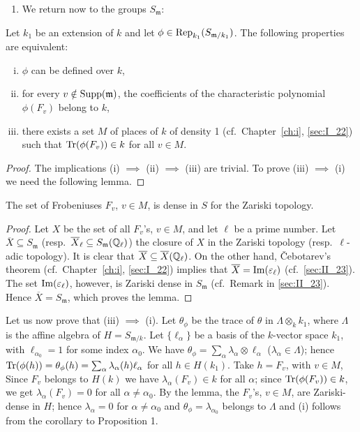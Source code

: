 \begin{enumerate}[resume*]
	\item We return now to the groups $S_{\mathfrak{m}}$:
\end{enumerate}
\begin{prop}
Let $k_1$ be an extension of $k$ and let $\phi \in
\operatorname{Rep}_{k_1}(S_{\mathfrak{m} /k_1})$. The following properties are equivalent:
\begin{enumerate}[(i)]
\item $\phi$ can be defined over $k$,
\item for every $v \notin \operatorname{Supp}(\mathfrak{m})$, the coefficients of the
	characteristic polynomial $\phi(F_v)$ belong to $k$,
\item there exists a set $M$ of places of $k$ of density 1 (cf.\ 
	Chapter~\ref{ch:i}, \ref{sec:I_22}) such that $\operatorname{Tr}(\phi(F_v)) \in k$
	for all $v \in M$.
\end{enumerate}
\end{prop}
\begin{proof}
The implications (i) $\implies$ (ii) $\implies$ (iii) are trivial.
To prove (iii) $\implies$ (i) we need the following lemma.
\end{proof}

\begin{lem}
	The set of Frobeniuses $F_v$, $v \in M$, is dense in $S$ for
	the Zariski topology.
\end{lem}
\begin{proof}
Let $X$ be the set of all $F_v$'s, $v \in M$, and let $\ell$ be a prime number.
Let $\overline{X} \subseteq S_{\mathfrak{m}}$ (resp.\ $\overline{X}_\ell
\subseteq S_{\mathfrak{m}}(\mathbb{Q}_\ell)$) the closure of $X$ in the Zariski
topology (resp.\ $\ell$-adic topology). It is clear that
\dpage
$\overline{X} \subseteq \overline{X}(\mathbb{Q}_\ell)$. On the other hand, \v
Cebotarev's theorem (cf.\ Chapter~\ref{ch:i}, \ref{sec:I_22}) implies that
$\overline{X} = \operatorname{Im}(\varepsilon_\ell)$ (cf.\ \ref{sec:II_23}). The set
$\operatorname{Im}(\varepsilon_\ell)$, however, is Zariski dense in $S_{\mathfrak{m}}$ (cf.\ 
Remark in \ref{sec:II_23}). Hence $\overline{X} = S_{\mathfrak{m}}$, which
proves the lemma.
\end{proof}

Let us now prove that (iii) $\implies$ (i). Let $\theta_\phi$ be the trace
of $\theta$ in $\Lambda \otimes_k k_1$, where $\Lambda$ is the affine algebra
of $H = S_{\mathfrak{m} /k}$. Let $\{ \ell_\alpha \}$ be a basis of the
$k$-vector space $k_1$, with $\ell_{\alpha_0} = 1$ for some index $\alpha_0$.
We have $\theta_\phi = \sum_{\alpha} \lambda_\alpha \otimes \ell_\alpha$
($\lambda_\alpha \in \Lambda$); hence $\operatorname{Tr}( \phi(h) ) = \theta_\phi(h) =
\sum_{\alpha} \lambda_\alpha(h) \ell_\alpha$ for all $h \in H(k_1)$. Take $h =
F_v$, with $v \in M$, Since $F_v$ belongs to $H(k)$ we have
$\lambda_\alpha(F_v) \in k$ for all $\alpha$; since $\operatorname{Tr}(\phi(F_v)) \in k$,
we get $\lambda_\alpha(F_v) = 0$ for all $\alpha \ne \alpha_0$. By the lemma,
the $F_v$'s, $v \in M$, are Zariski-dense in $H$; hence $\lambda_\alpha = 0$
for $\alpha \ne \alpha_0$ and $\theta_\phi = \lambda_{\alpha_0}$ belongs to
$\Lambda$ and (i) follows from the corollary to Proposition 1.
\hfill
\qedsymbol

